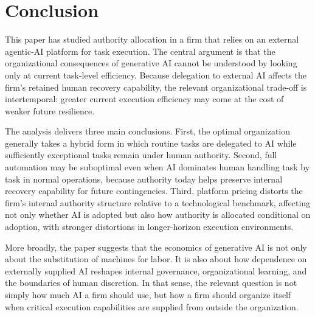 \section{Conclusion}
\label{sec:conclusion}

This paper has studied authority allocation in a firm that relies on an external agentic-AI platform for task execution. The central argument is that the organizational consequences of generative AI cannot be understood by looking only at current task-level efficiency. Because delegation to external AI affects the firm's retained human recovery capability, the relevant organizational trade-off is intertemporal: greater current execution efficiency may come at the cost of weaker future resilience.

The analysis delivers three main conclusions. First, the optimal organization generally takes a hybrid form in which routine tasks are delegated to AI while sufficiently exceptional tasks remain under human authority. Second, full automation may be suboptimal even when AI dominates human handling task by task in normal operations, because authority today helps preserve internal recovery capability for future contingencies. Third, platform pricing distorts the firm's internal authority structure relative to a technological benchmark, affecting not only whether AI is adopted but also how authority is allocated conditional on adoption, with stronger distortions in longer-horizon execution environments.

More broadly, the paper suggests that the economics of generative AI is not only about the substitution of machines for labor. It is also about how dependence on externally supplied AI reshapes internal governance, organizational learning, and the boundaries of human discretion. In that sense, the relevant question is not simply how much AI a firm should use, but how a firm should organize itself when critical execution capabilities are supplied from outside the organization.
